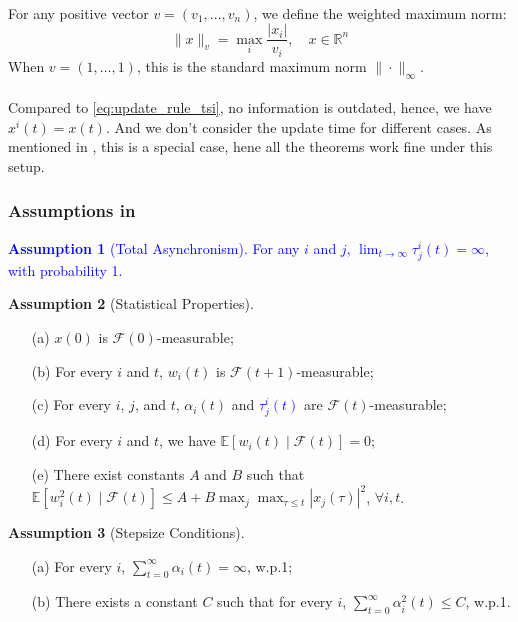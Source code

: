 \\
For any positive vector $v = (v_1, \ldots, v_n)$, we define the weighted maximum norm:
\begin{equation*}
\|x\|_v = \max_i \frac{|x_i|}{v_i}, \quad x \in \mathbb{R}^n
\end{equation*}
\noindent When $v = (1,\ldots,1)$, this is the standard maximum norm $\|\cdot\|_{\infty}$.\\
\\
\noindent Compared to \autoref{eq:update_rule_tsi}, no information is outdated, hence, we have $x^i(t) = x(t)$. And we don't consider the update time for different cases. As mentioned in \cite{tsitsiklis1994asynchronous}, this is a special case, hene all the theorems work fine under this setup.

\subsubsection{Assumptions in \cite{tsitsiklis1994asynchronous}}

\noindent
\textcolor{blue}{\textbf{Assumption 1} (Total Asynchronism).
For any $i$ and $j$, $\lim_{t \to \infty} \tau_j^i(t) = \infty$, with probability 1.}

\vspace{1em}

\noindent
\textbf{Assumption 2} (Statistical Properties).
\begin{enumerate}
\item[(a)] $x(0)$ is $\mathcal{F}(0)$-measurable;
\item[(b)] For every $i$ and $t$, $w_i(t)$ is $\mathcal{F}(t+1)$-measurable;
\item[(c)] For every $i$, $j$, and $t$, $\alpha_i(t)$ and \textcolor{blue}{$\tau_j^i(t)$} are $\mathcal{F}(t)$-measurable;
\item[(d)] For every $i$ and $t$, we have $\mathbb{E}[w_i(t) \mid \mathcal{F}(t)] = 0$;
\item[(e)] There exist constants $A$ and $B$ such that
$\mathbb{E}[w_i^2(t) \mid \mathcal{F}(t)] \leq A + B \max_j \max_{\tau \leq t} |x_j(\tau)|^2$, $\forall i, t$.
\end{enumerate}

\vspace{1em}

\noindent
\textbf{Assumption 3} (Stepsize Conditions).
\begin{enumerate}
\item[(a)] For every $i$, $\sum_{t=0}^{\infty} \alpha_i(t) = \infty$, w.p.1;
\item[(b)] There exists a constant $C$ such that for every $i$, $\sum_{t=0}^{\infty} \alpha_i^2(t) \leq C$, w.p.1.
\end{enumerate}

